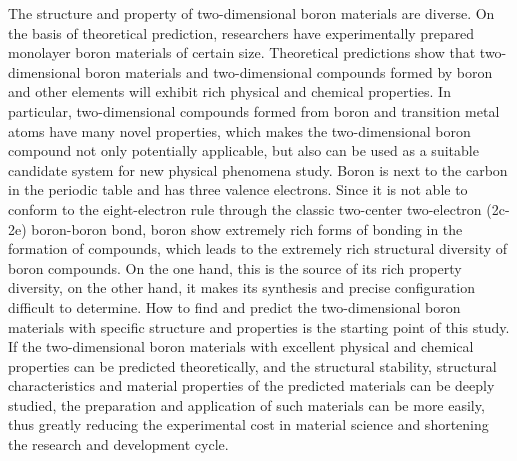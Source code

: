 \documentclass[phd,nobackinfo]{scutthesis}
\begin{document}
\begin{englishabstract}
The structure and property of two-dimensional boron materials are diverse. On the basis of theoretical prediction, researchers have experimentally prepared monolayer boron materials of certain size.
Theoretical predictions show that two-dimensional boron materials and two-dimensional compounds formed by boron and other elements will exhibit rich physical and chemical properties.
In particular, two-dimensional compounds formed from boron and transition metal atoms have many novel properties, which makes the two-dimensional boron compound not only potentially applicable, but also can be used as a suitable candidate system for new physical phenomena study.
Boron is next to the carbon in the periodic table and has three valence electrons. Since it is not able to conform to the eight-electron rule through the classic two-center two-electron (2c-2e) boron-boron bond, boron show extremely rich forms of bonding in the formation of compounds, which leads to the extremely rich structural diversity of boron compounds.
On the one hand, this is the source of its rich property diversity, on the other hand, it makes its synthesis and precise configuration difficult to determine.
How to find and predict the two-dimensional boron materials with specific structure and properties is the starting point of this study.
If the two-dimensional boron materials with excellent physical and chemical properties can be predicted theoretically, and the structural stability, structural characteristics and material properties of the predicted materials can be deeply studied, the preparation and application of such materials can be more easily, thus greatly reducing the experimental cost in material science and shortening the research and development cycle.


\end{englishabstract}
\end{document}
